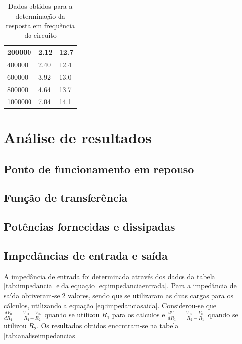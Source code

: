 \documentclass[%
  reprint,
  nofootinbib,
  amsmath,amssymb,
  aps,
  10pt,
  a4paper
]{revtex4-1}
\begin{document}
{\begin{table}[h]
\begin{tabular}{|l|l|l|}
    200000                           & 2.12  & 12.7  \\ \hline
    400000                           & 2.40  & 12.4  \\ \hline
    600000                           & 3.92  & 13.0  \\ \hline
    800000                           & 4.64  & 13.7  \\ \hline
    1000000                          & 7.04  & 14.1  \\ \hline
    \end{tabular}
\caption{Dados obtidos para a determinação da resposta em frequência do circuito}
\label{tab:respostafrequenciaresultados}
\end{table}








\section{Análise de resultados}
\label{s:aresul}
\subsection{Ponto de funcionamento em repouso}
\subsection{Função de transferência}
\subsection{Potências fornecidas e dissipadas}
\subsection{Impedâncias de entrada e saída}
A impedância de entrada foi determinada através dos dados da tabela \ref{tab:impedancia} e da equação \ref{eq:impedanciaentrada}. Para a impedância de saída obtiveram-se 2 valores, sendo que se utilizaram as duas cargas para os cálculos, utilizando a equação \ref{eq:impedanciasaida}. Considerou-se que $\frac{dV_0}{dR_1}=\frac{V_{01}-V_{02}}{R_1-R_2}$ quando se utilizou $R_1$ para os cálculos e $\frac{dV_0}{dR_1}=\frac{V_{02}-V_{01}}{R_2-R_1}$ quando se utilizou $R_2$. Os resultados obtidos encontram-se na tabela \ref{tab:analiseimpedancias}


}
\end{document}
